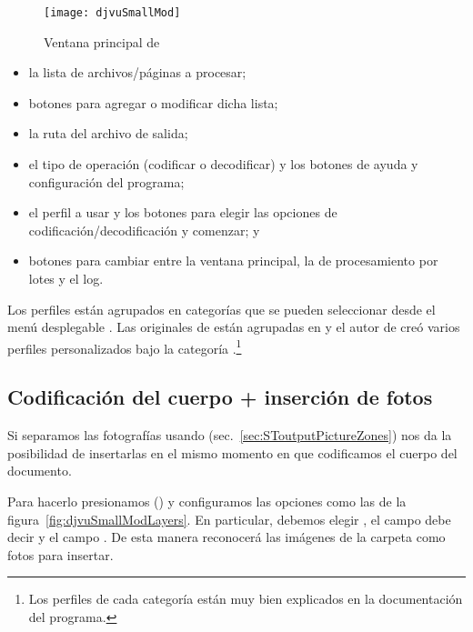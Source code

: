 \documentclass[%
	a5paper,
	10pt,
	twoside,
	openright,
	final,
]{memoir}
\begin{document}
	\begin{figure}
		\texttt{[image: djvuSmallMod]}
		\caption{Ventana principal de \djvusmallmod\label{fig:djvuSmallMod}}
	\end{figure}

	\begin{itemize}[noitemsep]
		\item la lista de archivos/páginas a procesar;
		\item botones para agregar o modificar dicha lista;
		\item la ruta del archivo de salida;
		\item el tipo de operación (codificar o decodificar) y los botones de ayuda y configuración del programa;
		\item el perfil a usar y los botones para elegir las opciones de codificación/decodificación y comenzar; y
		\item botones para cambiar entre la ventana principal, la de procesamiento por lotes y el log.
	\end{itemize}

	Los perfiles están agrupados en categorías que se pueden seleccionar desde el menú desplegable . Las originales de \dexpress están agrupadas en  y el autor de \djvusmallmod creó varios perfiles personalizados bajo la categoría .\footnote{Los perfiles de cada categoría están muy bien explicados en la documentación del programa.}

	\subsection{Codificación del cuerpo + inserción de fotos\label{sec:djvuSmallModPhotos}} Si separamos las fotografías usando \scantailor (sec.~\ref{sec:SToutputPictureZones}) \djvusmallmod nos da la posibilidad de insertarlas en el mismo momento en que codificamos el cuerpo del documento.

	Para hacerlo presionamos \keys{\faFilter} () y configuramos las opciones como las de la figura~\ref{fig:djvuSmallModLayers}. En particular, debemos elegir , el campo  debe decir  y el campo  . De esta manera reconocerá las imágenes de la carpeta  como fotos para insertar.
\end{document}
